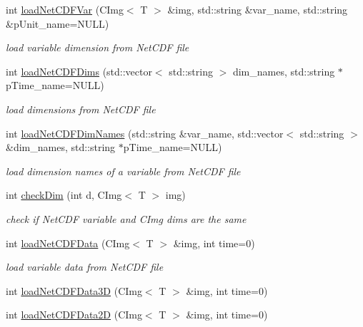 \begin{DoxyCompactItemize}
\item 
int \hyperlink{classCImgNetCDF_a72dbe97219bf43d21637dc01dcc972f6}{loadNetCDFVar} (CImg$<$ T $>$ \&img, std::string \&var\_\-name, std::string \&pUnit\_\-name=NULL)
\begin{DoxyCompactList}\small\item\em load variable dimension from NetCDF file \item\end{DoxyCompactList}\item 
int \hyperlink{classCImgNetCDF_a2cbfbccd1c9c37d7cbdafe9714c3cde8}{loadNetCDFDims} (std::vector$<$ std::string $>$ dim\_\-names, std::string $\ast$pTime\_\-name=NULL)
\begin{DoxyCompactList}\small\item\em load dimensions from NetCDF file \item\end{DoxyCompactList}\item 
int \hyperlink{classCImgNetCDF_a350b9626b09d65e530c08ae5dea60484}{loadNetCDFDimNames} (std::string \&var\_\-name, std::vector$<$ std::string $>$ \&dim\_\-names, std::string $\ast$pTime\_\-name=NULL)
\begin{DoxyCompactList}\small\item\em load dimension names of a variable from NetCDF file \item\end{DoxyCompactList}\item 
int \hyperlink{classCImgNetCDF_aa5dd32c8cec3b27aee106846b3fc67c9}{checkDim} (int d, CImg$<$ T $>$ img)
\begin{DoxyCompactList}\small\item\em check if NetCDF {\ttfamily variable} and {\ttfamily CImg} dims are the same \item\end{DoxyCompactList}\item 
int \hyperlink{classCImgNetCDF_aa96033c01ced12a4fbe89ab8c7a3dade}{loadNetCDFData} (CImg$<$ T $>$ \&img, int time=0)
\begin{DoxyCompactList}\small\item\em load variable data from NetCDF file \item\end{DoxyCompactList}\item 
int \hyperlink{classCImgNetCDF_aa573424ddff780eeaa637ff276593ac2}{loadNetCDFData3D} (CImg$<$ T $>$ \&img, int time=0)
\item 
int \hyperlink{classCImgNetCDF_a9e50ee49eb23896c5aa7de39e790464a}{loadNetCDFData2D} (CImg$<$ T $>$ \&img, int time=0)

\end{DoxyCompactItemize}

